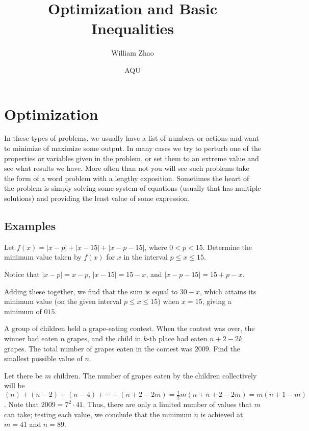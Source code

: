 \documentclass{article}
\title{Optimization and Basic Inequalities}
\author{William Zhao}
\date{AQU}
\begin{document}
\maketitle

\section{Optimization}

In these types of problems, we usually have a list of numbers or actions and want to minimize of maximize some output. In many cases we try to perturb one of the properties or variables given in the problem, or set them to an extreme value and see what results we have. More often than not you will see such problems take the form of a word problem with a lengthy exposition. Sometimes the heart of the problem is simply solving some system of equations (usually that has multiple solutions) and providing the least value of some expression.  

\subsection{Examples}
\begin{exam}[AIME 1983/2]
Let $f(x)=|x-p|+|x-15|+|x-p-15|$, where $0<p<15$. Determine the minimum value taken by $f(x)$ for $x$ in the interval $p\le x\le 15$. 
\end{exam}
\begin{sol}
Notice that $|x-p|=x-p$, $|x-15|=15-x$, and $|x-p-15|=15+p-x$.

Adding these together, we find that the sum is equal to $30-x$, which attains its minimum value (on the given interval $p \leq x \leq 15$) when $x=15$, giving a minimum of $\boxed{015}$.
\end{sol}

\begin{exam}[AIME II 2009/4]
A group of children held a grape-eating contest. When the contest was over, the winner had eaten $n$ grapes, and the child in $k$-th place had eaten $n+2-2k$ grapes. The total number of grapes eaten in the contest was $2009$. Find the smallest possible value of $n$.
\end{exam}
\begin{sol}
Let there be $m$ children. The number of grapes eaten by the children collectively will be $(n)+(n-2)+(n-4)+\cdots+(n+2-2m)=\frac12m(n+n+2-2m)=m(n+1-m)$. Note that $2009=7^2\cdot 41$. Thus, there are only a limited number of values that $m$ can take; testing each value, we conclude that the minimum $n$ is achieved at $m=41$ and $n=89$. 
\end{sol}
\end{document}
